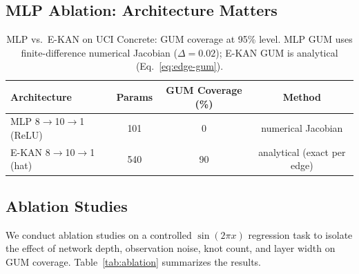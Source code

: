 \documentclass{article}
\begin{document}
\subsection{MLP Ablation: Architecture Matters}
\label{sec:mlp}


\begin{table}[t]
\centering
\caption{MLP vs.\ E-KAN on UCI Concrete: GUM coverage at 95\% level.
MLP GUM uses finite-difference numerical Jacobian ($\Delta=0.02$); E-KAN GUM
is analytical (Eq.~\ref{eq:edge-gum}).}
\label{tab:mlp}
\begin{tabular}{@{}lccc@{}}
\toprule
\textbf{Architecture} & \textbf{Params} & \textbf{GUM Coverage (\%)} & \textbf{Method} \\
\midrule
MLP 8$\to$10$\to$1 (ReLU)  & 101 &  0 & numerical Jacobian \\
E-KAN 8$\to$10$\to$1 (hat) & 540 & 90 & analytical (exact per edge) \\
\bottomrule
\end{tabular}
\end{table}


\subsection{Ablation Studies}
\label{sec:ablation}

We conduct ablation studies on a controlled $\sin(2\pi x)$ regression task
to isolate the effect of network depth, observation noise, knot count, and
layer width on GUM coverage.  Table~\ref{tab:ablation} summarizes the results.
\end{document}
